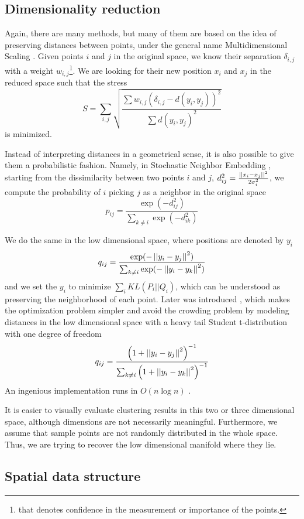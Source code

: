 \subsection{Dimensionality reduction}

Again, there are many methods, but many of them are based on the idea of
preserving distances between points, under the general name Multidimensional
Scaling \autocite{MDS77}. Given points $i$ and $j$ in the original space, we
know their separation $\delta_{i,j}$ with a weight $w_{i,j}$\footnote{that
denotes confidence in the measurement or importance of the points.}. We are
looking for their new position $x_i$ and $x_j$ in the reduced space such that
the stress \[ S = \sum_{i,j} \sqrt{\frac{\sum w_{i,j}(\delta_{i,j} - d(y_i,
y_j))^2}{\sum d(y_i, y_j)^2}} \] is minimized.

Instead of interpreting distances in a geometrical sense, it is also possible
to give them a probabilistic fashion.  Namely, in Stochastic Neighbor Embedding
\autocite{SNE02}, starting from the dissimilarity between two points $i$ and
$j$, $d^2_{ij} = \frac{\left|\left|x_i - x_j\right|\right|^2}{2\sigma^2_i}$, we compute the
probability of $i$ picking $j$ as a neighbor in the original space \[ p_{ij} =
\frac{\exp(-d_{ij}^2)}{\sum_{k \neq i}\exp(-d_{ik}^2)}\]

We do the same in the low dimensional space, where positions are denoted by
$y_i$ \[ q_{ij} = \frac{\exp(-\left|\left|y_i - y_j\right|\right|^2)}{\sum_{k \neq
i}\exp(-\left|\left|y_i - y_k\right|\right|^2)}\] and we set the $y_i$ to minimize $\sum_i
KL(P_i || Q_i)$, which can be understood as preserving the neighborhood of each
point. Later was introduced \tsne{} \autocite{tSNE08}, which makes the
optimization problem simpler and avoid the crowding problem by modeling
distances in the low dimensional space with a heavy tail Student t-distribution
with one degree of freedom \[ q_{ij} = \frac{\left(1+\left|\left|y_i -
y_j\right|\right|^2\right)^{-1}}{\sum_{k \neq i}\left(1+\left|\left|y_i - y_k\right|\right|^2\right)^{-1}}\]
An ingenious implementation runs in $O(n\log n)$ \autocite{BarnesHut13}.

It is easier to visually evaluate clustering results in this two or three
dimensional space, although dimensions are not necessarily meaningful.
Furthermore, we assume that sample points are not randomly distributed in the
whole space. Thus, we are trying to recover the low dimensional manifold where
they lie.

\subsection{Spatial data structure}
\label{sub:spatial-structures}

